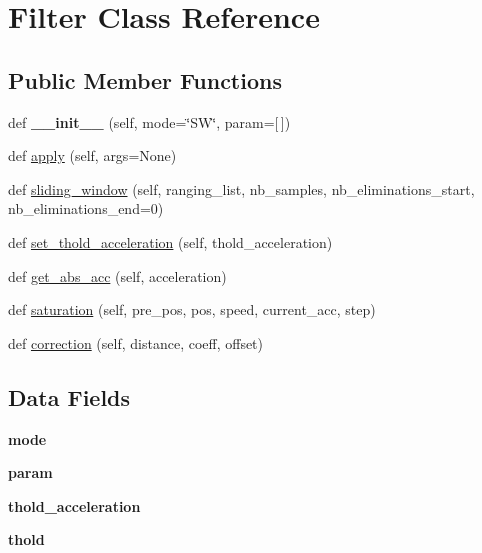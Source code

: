 \hypertarget{class_filter_1_1_filter}{}\section{Filter Class Reference}
\label{class_filter_1_1_filter}
\subsection*{Public Member Functions}
\begin{DoxyCompactItemize}
\item 
\mbox{\label{class_filter_1_1_filter_a74fa11d293d3411bd3c44013a9a6acf6}} 
def {\bfseries \+\_\+\+\_\+init\+\_\+\+\_\+} (self, mode=\char`\"{}SW\char`\"{}, param=\mbox{[}$\,$\mbox{]})
\item 
def \mbox{\hyperlink{class_filter_1_1_filter_a9849d232d39b301ea2c8b2489e7bae25}{apply}} (self, args=None)
\item 
def \mbox{\hyperlink{class_filter_1_1_filter_a556284b0965efd1d347565d76c51a4ee}{sliding\+\_\+window}} (self, ranging\+\_\+list, nb\+\_\+samples, nb\+\_\+eliminations\+\_\+start, nb\+\_\+eliminations\+\_\+end=0)
\item 
def \mbox{\hyperlink{class_filter_1_1_filter_ac495c6d2389da8dc58b01a672e6cfd11}{set\+\_\+thold\+\_\+acceleration}} (self, thold\+\_\+acceleration)
\item 
def \mbox{\hyperlink{class_filter_1_1_filter_a2c58efe0f4ad2e2b24ca15cfcac279de}{get\+\_\+abs\+\_\+acc}} (self, acceleration)
\item 
def \mbox{\hyperlink{class_filter_1_1_filter_aa13f0d1f1966e7f0dc438953a43d7c52}{saturation}} (self, pre\+\_\+pos, pos, speed, current\+\_\+acc, step)
\item 
def \mbox{\hyperlink{class_filter_1_1_filter_a48a07f17663fd614b10c091f30ec782d}{correction}} (self, distance, coeff, offset)
\end{DoxyCompactItemize}
\subsection*{Data Fields}
\begin{DoxyCompactItemize}
\item 
\mbox{\label{class_filter_1_1_filter_a1a6b6fb557d8d37d59700faf4e4c9167}} 
{\bfseries mode}
\item 
\mbox{\label{class_filter_1_1_filter_a51f20d6b1b54a2eee3be0e8adc96a0ae}} 
{\bfseries param}
\item 
\mbox{\label{class_filter_1_1_filter_acc0e17141a32daebdc6c3855ff16605e}} 
{\bfseries thold\+\_\+acceleration}
\item 
\mbox{\label{class_filter_1_1_filter_a2b3aab3856fbe5755a12e11bd5d95177}} 
{\bfseries thold}
\end{DoxyCompactItemize}



